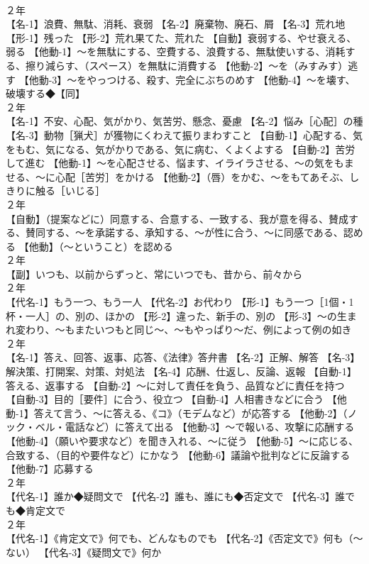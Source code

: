 \documentclass[8pt]{extreport}
\begin{document}
\begin{CJK}{UTF8}{min}
\\	２年	
\\	【名-1】浪費、無駄、消耗、衰弱 【名-2】廃棄物、廃石、屑 【名-3】荒れ地 【形-1】残った 【形-2】荒れ果てた、荒れた 【自動】衰弱する、やせ衰える、弱る 【他動-1】～を無駄にする、空費する、浪費する、無駄使いする、消耗する、擦り減らす、（スペース）を無駄に消費する 【他動-2】～を（みすみす）逃す 【他動-3】～をやっつける、殺す、完全にぶちのめす 【他動-4】～を壊す、破壊する◆【同】
\\	２年	
\\	【名-1】不安、心配、気がかり、気苦労、懸念、憂慮 【名-2】悩み［心配］の種 【名-3】動物［猟犬］が獲物にくわえて振りまわすこと 【自動-1】心配する、気をもむ、気になる、気がかりである、気に病む、くよくよする 【自動-2】苦労して進む 【他動-1】～を心配させる、悩ます、イライラさせる、～の気をもませる、～に心配［苦労］をかける 【他動-2】（唇）をかむ、～をもてあそぶ、しきりに触る［いじる］
\\	２年	
\\	【自動】（提案などに）同意する、合意する、一致する、我が意を得る、賛成する、賛同する、～を承諾する、承知する、～が性に合う、～に同感である、認める 【他動】（～ということ）を認める
\\	２年	
\\	【副】いつも、以前からずっと、常にいつでも、昔から、前々から
\\	２年	
\\	【代名-1】もう一つ、もう一人 【代名-2】お代わり 【形-1】もう一つ［1個・1杯・一人］の、別の、ほかの 【形-2】違った、新手の、別の 【形-3】～の生まれ変わり、～もまたいつもと同じ～、～もやっぱり～だ、例によって例の如き
\\	２年	
\\	【名-1】答え、回答、返事、応答、《法律》答弁書 【名-2】正解、解答 【名-3】解決策、打開案、対策、対処法 【名-4】応酬、仕返し、反論、返報 【自動-1】答える、返事する 【自動-2】～に対して責任を負う、品質などに責任を持つ 【自動-3】目的［要件］に合う、役立つ 【自動-4】人相書きなどに合う 【他動-1】答えて言う、～に答える、《コ》（モデムなど）が応答する 【他動-2】（ノック・ベル・電話など）に答えて出る 【他動-3】～で報いる、攻撃に応酬する 【他動-4】（願いや要求など）を聞き入れる、～に従う 【他動-5】～に応じる、合致する、（目的や要件など）にかなう 【他動-6】議論や批判などに反論する 【他動-7】応募する
\\	２年	
\\	【代名-1】誰か◆疑問文で 【代名-2】誰も、誰にも◆否定文で 【代名-3】誰でも◆肯定文で
\\	２年	
\\	【代名-1】《肯定文で》何でも、どんなものでも 【代名-2】《否定文で》何も（～ない） 【代名-3】《疑問文で》何か

\end{CJK}
\end{document}
